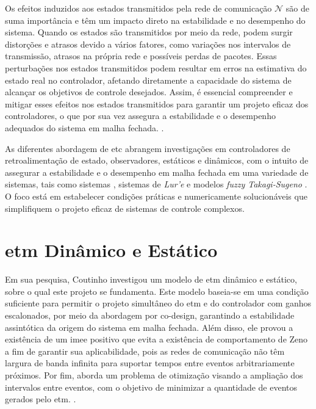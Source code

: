 Os efeitos induzidos aos estados transmitidos pela rede de comunicação $\mathcal{N}$ são de suma importância e têm um impacto direto na estabilidade e no desempenho do sistema. Quando os estados são transmitidos por meio da rede, podem surgir distorções e atrasos devido a vários fatores, como variações nos intervalos de transmissão, atrasos na própria rede e possíveis perdas de pacotes. Essas perturbações nos estados transmitidos podem resultar em erros na estimativa do estado real no controlador, afetando diretamente a capacidade do sistema de alcançar os objetivos de controle desejados. Assim, é essencial compreender e mitigar esses efeitos nos estados transmitidos para garantir um projeto eficaz dos controladores, o que por sua vez assegura a estabilidade e o desempenho adequados do sistema em malha fechada. \cite{coutinho2021}.

As diferentes abordagem de \acrshort{etc} abrangem investigações em controladores de retroalimentação de estado, observadores,  estáticos e dinâmicos, com o intuito de assegurar a estabilidade e o desempenho em malha fechada em uma variedade de sistemas, tais como sistemas  \cite{Zong2023,Wu2021}, sistemas de \textit{Lur'e} \cite{Zhang2017} e modelos \textit{fuzzy Takagi-Sugeno} \cite{Pan2017}. O foco está em estabelecer condições práticas e numericamente solucionáveis que simplifiquem o projeto eficaz de sistemas de controle complexos.

\section{\acrshort{etm} Dinâmico e Estático}

Em sua pesquisa, Coutinho investigou um modelo de \acrshort{etm} dinâmico e estático, sobre o qual este projeto se fundamenta. Este modelo baseia-se em uma condição suficiente para permitir o projeto simultâneo do \acrshort{etm} e do controlador com ganhos escalonados, por meio da abordagem por co-design, garantindo a estabilidade assintótica da origem do sistema em malha fechada. Além disso, ele provou a existência de um \acrfull{imee} positivo que evita a existência de comportamento de Zeno a fim de garantir sua aplicabilidade, pois as redes de comunicação não têm largura de banda infinita para suportar tempos entre eventos arbitrariamente próximos. Por fim, aborda um problema de otimização visando a ampliação dos intervalos entre eventos, com o objetivo de minimizar a quantidade de eventos gerados pelo \acrshort{etm}. \cite{coutinho2021}.

